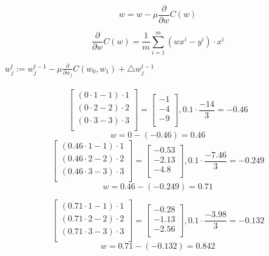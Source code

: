 \documentclass[12pt]{article}
\begin{document}
\begin{equation}
w=w-\mu \frac{\partial}{\partial w}C(w)
\end{equation}

\begin{equation}
\frac{\partial}{\partial w}C(w)
=\frac{1}{m}\sum_{i=1}^{m}(wx^i-y^{i})\cdot x^{i}
\end{equation}

$w_j^t:=w_j^{t-1}-\mu\frac{\partial}{\partial w_j}C(w_0,w_1)+\triangle w_j^{t-1}$\\

\newpage\
\begin{equation}
\left[
\begin{matrix}
	(0 \cdot 1 - 1)\cdot 1 \\
	(0 \cdot 2 - 2)\cdot 2 \\
	(0 \cdot 3 - 3)\cdot 3 \\
\end{matrix} \right]
=\left[
\begin{matrix}
	-1\\
	-4\\
	-9\\
\end{matrix} \right],
0.1 \cdot \frac{-14}{3}=-0.46
\end{equation}
\begin{equation}
w = 0 - (-0.46)=0.46
\end{equation}
\begin{equation}
\left[
\begin{matrix}
	(0.46 \cdot 1 - 1)\cdot 1\\
	(0.46 \cdot 2 - 2)\cdot 2\\
	(0.46 \cdot 3 - 3)\cdot 3\\
\end{matrix} \right]
=\left[
\begin{matrix}
	-0.53\\
	-2.13\\
	-4.8\\
\end{matrix} \right],
0.1 \cdot \frac{-7.46}{3}=-0.249
\end{equation}
\begin{equation}
w = 0.46 - (-0.249)=0.71
\end{equation}

\begin{equation}
\left[
\begin{matrix}
	(0.71 \cdot 1 - 1)\cdot 1\\
	(0.71 \cdot 2 - 2)\cdot 2\\
	(0.71 \cdot 3 - 3)\cdot 3\\
\end{matrix} \right]
=\left[
\begin{matrix}
	-0.28\\
	-1.13\\
	-2.56\\
\end{matrix} \right],
0.1 \cdot \frac{-3.98}{3}=-0.132
\end{equation}
\begin{equation}
w = 0.71 - (-0.132)=0.842
\end{equation}
\newpage\
\end{document}
